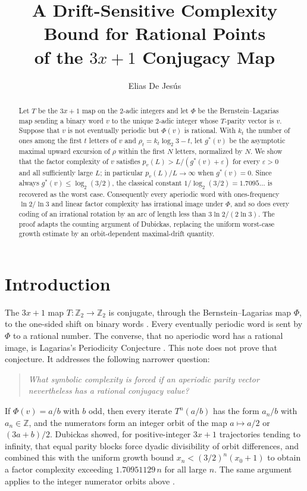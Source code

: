\documentclass[11pt]{amsart}
\title[Drift-sensitive complexity for rational points of the $3x+1$ conjugacy]{A Drift-Sensitive Complexity Bound for Rational Points\\ of the $3x+1$ Conjugacy Map}
\author{Elias De Jes\'us}
\date{}
\theoremstyle{definition}
\theoremstyle{remark}
\newcommand{\Z}{\mathbb{Z}}
\newcommand{\gs}{g^{*}}
\begin{document}
\begin{abstract}
Let $T$ be the $3x+1$ map on the $2$-adic integers and let $\Phi$ be the Bernstein--Lagarias map sending a binary word $v$ to the unique $2$-adic integer whose $T$-parity vector is $v$. Suppose that $v$ is not eventually periodic but $\Phi(v)$ is rational. With $k_t$ the number of ones among the first $t$ letters of $v$ and $\rho_t=k_t\log_2 3-t$, let $\gs(v)$ be the asymptotic maximal upward excursion of $\rho$ within the first $N$ letters, normalized by $N$. We show that the factor complexity of $v$ satisfies $p_v(L)>L/(\gs(v)+\varepsilon)$ for every $\varepsilon>0$ and all sufficiently large $L$; in particular $p_v(L)/L\to\infty$ when $\gs(v)=0$. Since always $\gs(v)\le\log_2(3/2)$, the classical constant $1/\log_2(3/2)=1.7095\ldots$ is recovered as the worst case. Consequently every aperiodic word with ones-frequency $\ln 2/\ln 3$ and linear factor complexity has irrational image under $\Phi$, and so does every coding of an irrational rotation by an arc of length less than $3\ln 2/(2\ln 3)$. The proof adapts the counting argument of Dubickas, replacing the uniform worst-case growth estimate by an orbit-dependent maximal-drift quantity.
\end{abstract}

\maketitle

\section{Introduction}

The $3x+1$ map $T\colon\Z_2\to\Z_2$ is conjugate, through the Bernstein--Lagarias map $\Phi$, to the one-sided shift on binary words \cite{Ber94,BL96}. Every eventually periodic word is sent by $\Phi$ to a rational number. The converse, that no aperiodic word has a rational image, is Lagarias's Periodicity Conjecture \cite{Lag85,BL96}. This note does not prove that conjecture. It addresses the following narrower question:
\begin{quote}
\emph{What symbolic complexity is forced if an aperiodic parity vector nevertheless has a rational conjugacy value?}
\end{quote}

If $\Phi(v)=a/b$ with $b$ odd, then every iterate $T^n(a/b)$ has the form $a_n/b$ with $a_n\in\Z$, and the numerators form an integer orbit of the map $a\mapsto a/2$ or $(3a+b)/2$. Dubickas \cite{Dub09} showed, for positive-integer $3x+1$ trajectories tending to infinity, that equal parity blocks force dyadic divisibility of orbit differences, and combined this with the uniform growth bound $x_n<(3/2)^n(x_0+1)$ to obtain a factor complexity exceeding $1.70951129\,n$ for all large $n$. The same argument applies to the integer numerator orbits above \cite[Cor.~9.3]{DJ26}.
\end{document}
